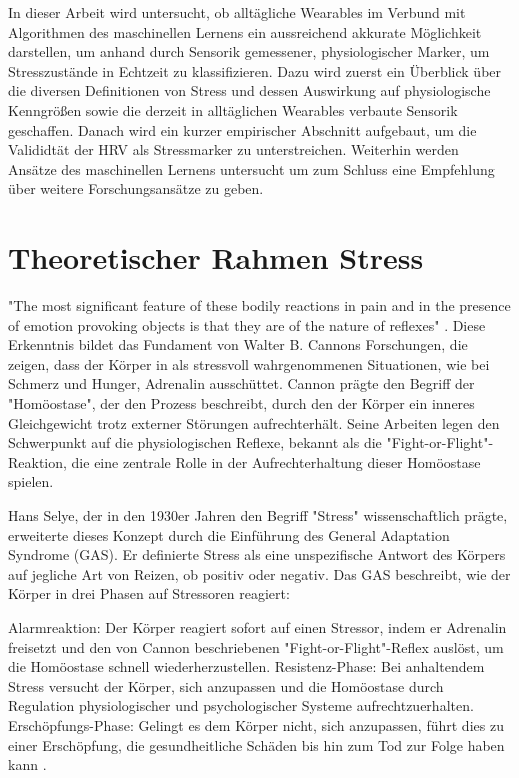 In dieser Arbeit wird untersucht, ob alltägliche Wearables im Verbund mit Algorithmen des maschinellen Lernens ein aussreichend akkurate Möglichkeit darstellen, um anhand durch Sensorik 
gemessener, physiologischer Marker, um Stresszustände in Echtzeit zu klassifizieren. Dazu wird zuerst ein Überblick über die diversen Definitionen von Stress und dessen Auswirkung auf physiologische Kenngrößen sowie 
die derzeit in alltäglichen Wearables verbaute Sensorik geschaffen. Danach wird ein kurzer empirischer Abschnitt aufgebaut, um die Valididtät der \ac{HRV} als Stressmarker zu unterstreichen.
Weiterhin werden Ansätze des maschinellen Lernens untersucht um zum Schluss eine Empfehlung über weitere Forschungsansätze zu geben.

\section{Theoretischer Rahmen Stress}
"The most significant feature of these bodily reactions in pain and in the presence of emotion provoking objects is that they are of the nature of reflexes" \cite{Cannon1915}. 
Diese Erkenntnis bildet das Fundament von Walter B. Cannons Forschungen, die zeigen, dass der Körper in als stressvoll wahrgenommenen Situationen, wie bei Schmerz und Hunger, 
Adrenalin ausschüttet. Cannon prägte den Begriff der "Homöostase", der den Prozess beschreibt, durch den der Körper ein inneres Gleichgewicht trotz externer Störungen aufrechterhält. 
Seine Arbeiten legen den Schwerpunkt auf die physiologischen Reflexe, bekannt als die "Fight-or-Flight"-Reaktion, die eine zentrale Rolle in der Aufrechterhaltung dieser Homöostase spielen.

Hans Selye, der in den 1930er Jahren den Begriff "Stress" wissenschaftlich prägte, erweiterte dieses Konzept durch die Einführung des General Adaptation Syndrome (GAS). Er definierte Stress als eine unspezifische Antwort des 
Körpers auf jegliche Art von Reizen, ob positiv oder negativ. Das GAS beschreibt, wie der Körper in drei Phasen auf Stressoren reagiert:

Alarmreaktion: Der Körper reagiert sofort auf einen Stressor, indem er Adrenalin freisetzt und den von Cannon beschriebenen "Fight-or-Flight"-Reflex auslöst, um die 
Homöostase schnell wiederherzustellen.
Resistenz-Phase: Bei anhaltendem Stress versucht der Körper, sich anzupassen und die Homöostase durch Regulation physiologischer und psychologischer 
Systeme aufrechtzuerhalten.
Erschöpfungs-Phase: Gelingt es dem Körper nicht, sich anzupassen, führt dies zu einer Erschöpfung, die gesundheitliche Schäden bis hin zum Tod zur Folge 
haben kann \cite{Selye1936}.

